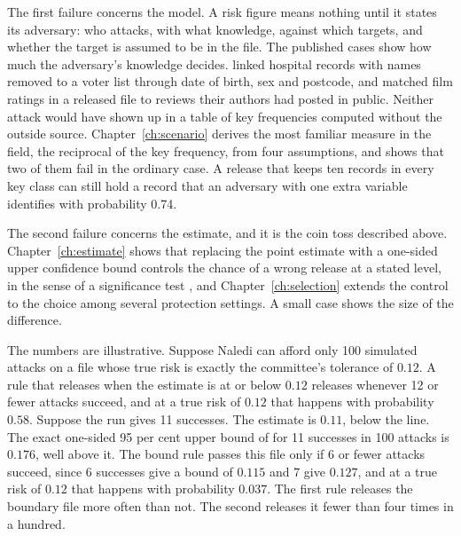 The first failure concerns the model. A risk figure means nothing until it states its
adversary: who attacks, with what knowledge, against which targets, and whether the target
is assumed to be in the file. The published cases show how much the adversary's knowledge decides. \citet{sweeney2002} linked hospital records with names removed to a voter list through date of birth, sex and postcode, and \citet{narayanan2008} matched film ratings in a released file to reviews their authors had posted in public. Neither attack would have shown up in a table of key frequencies computed without the outside source. Chapter~\ref{ch:scenario} derives the most familiar measure
in the field, the reciprocal of the key frequency, from four assumptions, and shows that
two of them fail in the ordinary case. A release that keeps ten records in every key class
can still hold a record that an adversary with one extra variable identifies with
probability 0.74.

The second failure concerns the estimate, and it is the coin toss described above.
Chapter~\ref{ch:estimate} shows that replacing the point estimate with a one-sided upper
confidence bound controls the chance of a wrong release at a stated level, in the sense of a significance test \citep{neyman1933}, and Chapter~\ref{ch:selection} extends the control to the choice among several protection settings. A small case shows the size of the difference.

\begin{example}\label{c1:ex-boundary}
The numbers are illustrative. Suppose Naledi can afford only 100 simulated attacks on a file whose true risk is exactly the committee's tolerance of $0.12$. A rule that releases when the estimate is at or below $0.12$ releases whenever 12 or fewer attacks succeed, and at a true risk of $0.12$ that happens with probability $0.58$. Suppose the run gives 11 successes. The estimate is $0.11$, below the line. The exact one-sided 95 per cent upper bound of \citet{clopper1934} for 11 successes in 100 attacks is $0.176$, well above it. The bound rule passes this file only if 6 or fewer attacks succeed, since 6 successes give a bound of $0.115$ and 7 give $0.127$, and at a true risk of $0.12$ that happens with probability $0.037$. The first rule releases the boundary file more often than not. The second releases it fewer than four times in a hundred.
\end{example}

